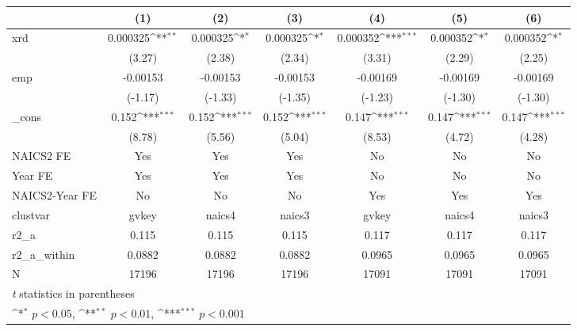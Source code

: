 {
\def\sym#1{\ifmmode^{#1}\else\(^{#1}\)\fi}
\begin{tabular}{l*{6}{c}}
\hline\hline
            &\multicolumn{1}{c}{(1)}         &\multicolumn{1}{c}{(2)}         &\multicolumn{1}{c}{(3)}         &\multicolumn{1}{c}{(4)}         &\multicolumn{1}{c}{(5)}         &\multicolumn{1}{c}{(6)}         \\
\hline
xrd         &    0.000325\sym{**} &    0.000325\sym{*}  &    0.000325\sym{*}  &    0.000352\sym{***}&    0.000352\sym{*}  &    0.000352\sym{*}  \\
            &      (3.27)         &      (2.38)         &      (2.34)         &      (3.31)         &      (2.29)         &      (2.25)         \\
[1em]
emp         &    -0.00153         &    -0.00153         &    -0.00153         &    -0.00169         &    -0.00169         &    -0.00169         \\
            &     (-1.17)         &     (-1.33)         &     (-1.35)         &     (-1.23)         &     (-1.30)         &     (-1.30)         \\
[1em]
\_cons      &       0.152\sym{***}&       0.152\sym{***}&       0.152\sym{***}&       0.147\sym{***}&       0.147\sym{***}&       0.147\sym{***}\\
            &      (8.78)         &      (5.56)         &      (5.04)         &      (8.53)         &      (4.72)         &      (4.28)         \\
[1em]
NAICS2 FE   &         Yes         &         Yes         &         Yes         &          No         &          No         &          No         \\
[1em]
Year FE     &         Yes         &         Yes         &         Yes         &          No         &          No         &          No         \\
[1em]
NAICS2-Year FE&          No         &          No         &          No         &         Yes         &         Yes         &         Yes         \\
\hline
clustvar    &       gvkey         &      naics4         &      naics3         &       gvkey         &      naics4         &      naics3         \\
r2\_a        &       0.115         &       0.115         &       0.115         &       0.117         &       0.117         &       0.117         \\
r2\_a\_within &      0.0882         &      0.0882         &      0.0882         &      0.0965         &      0.0965         &      0.0965         \\
N           &       17196         &       17196         &       17196         &       17091         &       17091         &       17091         \\
\hline\hline
\multicolumn{7}{l}{\footnotesize \textit{t} statistics in parentheses}\\
\multicolumn{7}{l}{\footnotesize \sym{*} \(p<0.05\), \sym{**} \(p<0.01\), \sym{***} \(p<0.001\)}\\
\end{tabular}
}
